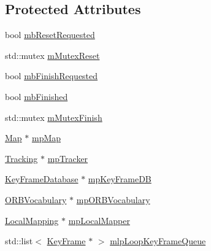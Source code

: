 \subsection*{Protected Attributes}
\begin{DoxyCompactItemize}
\item 
bool \mbox{\hyperlink{class_o_r_b___s_l_a_m2_1_1_loop_closing_ae9bac1131984f7915ab1fdf220912b0b}{mb\+Reset\+Requested}}
\item 
std\+::mutex \mbox{\hyperlink{class_o_r_b___s_l_a_m2_1_1_loop_closing_a979cad182a7f7bb08be165304d93106b}{m\+Mutex\+Reset}}
\item 
bool \mbox{\hyperlink{class_o_r_b___s_l_a_m2_1_1_loop_closing_a9e3dfbee3d1635fe11e600f94b0f60dc}{mb\+Finish\+Requested}}
\item 
bool \mbox{\hyperlink{class_o_r_b___s_l_a_m2_1_1_loop_closing_a6d8de49d49b647c33f3616f4cc95c42c}{mb\+Finished}}
\item 
std\+::mutex \mbox{\hyperlink{class_o_r_b___s_l_a_m2_1_1_loop_closing_a2bdc72e69885435e1c4f39b759c2ec8d}{m\+Mutex\+Finish}}
\item 
\mbox{\hyperlink{class_o_r_b___s_l_a_m2_1_1_map}{Map}} $\ast$ \mbox{\hyperlink{class_o_r_b___s_l_a_m2_1_1_loop_closing_a0b1dabf1326afa9d6a28768fd6f498b4}{mp\+Map}}
\item 
\mbox{\hyperlink{class_o_r_b___s_l_a_m2_1_1_tracking}{Tracking}} $\ast$ \mbox{\hyperlink{class_o_r_b___s_l_a_m2_1_1_loop_closing_ac3bff69250ab812292fb0a0e59cd3076}{mp\+Tracker}}
\item 
\mbox{\hyperlink{class_o_r_b___s_l_a_m2_1_1_key_frame_database}{Key\+Frame\+Database}} $\ast$ \mbox{\hyperlink{class_o_r_b___s_l_a_m2_1_1_loop_closing_a5bc11ebe6d60187d4d1708932bbb52f6}{mp\+Key\+Frame\+DB}}
\item 
\mbox{\hyperlink{namespace_o_r_b___s_l_a_m2_a2fafba714858cab1bb18d438e2e83c5d}{O\+R\+B\+Vocabulary}} $\ast$ \mbox{\hyperlink{class_o_r_b___s_l_a_m2_1_1_loop_closing_ac9d1b37eb70edbc013a431d92a4d86d1}{mp\+O\+R\+B\+Vocabulary}}
\item 
\mbox{\hyperlink{class_o_r_b___s_l_a_m2_1_1_local_mapping}{Local\+Mapping}} $\ast$ \mbox{\hyperlink{class_o_r_b___s_l_a_m2_1_1_loop_closing_a5eaa1b6d507d9bd138ab0f10a308e3c9}{mp\+Local\+Mapper}}
\item 
std\+::list$<$ \mbox{\hyperlink{class_o_r_b___s_l_a_m2_1_1_key_frame}{Key\+Frame}} $\ast$ $>$ \mbox{\hyperlink{class_o_r_b___s_l_a_m2_1_1_loop_closing_a4b5b9bb2ba5e3fe79428e4af9a002025}{mlp\+Loop\+Key\+Frame\+Queue}}
\item 

\end{DoxyCompactItemize}
